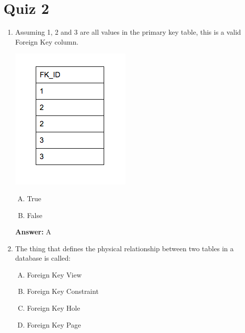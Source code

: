 \documentclass[12pt]{article}
\begin{document}
\bigskip

\section{Quiz 2}

\bigskip

\begin{enumerate}[1.]
    \item

    \bigskip

    Assuming 1, 2 and 3 are all values in the primary key table, this is a valid
    Foreign Key column.

    \begin{center}
    \includegraphics[width=0.4\linewidth]{images/part_2_notes_3.png}
    \end{center}

    \bigskip

    \begin{enumerate}[A.]
        \item True
        \item False
    \end{enumerate}

    \bigskip

    \textbf{Answer:} A

    \item

    \bigskip

    The thing that defines the physical relationship between two tables in a
    database is called:

    \bigskip

    \begin{enumerate}[A.]
        \item Foreign Key View
        \item Foreign Key Constraint
        \item Foreign Key Hole
        \item Foreign Key Page
    \end{enumerate}


\end{enumerate}
\end{document}
